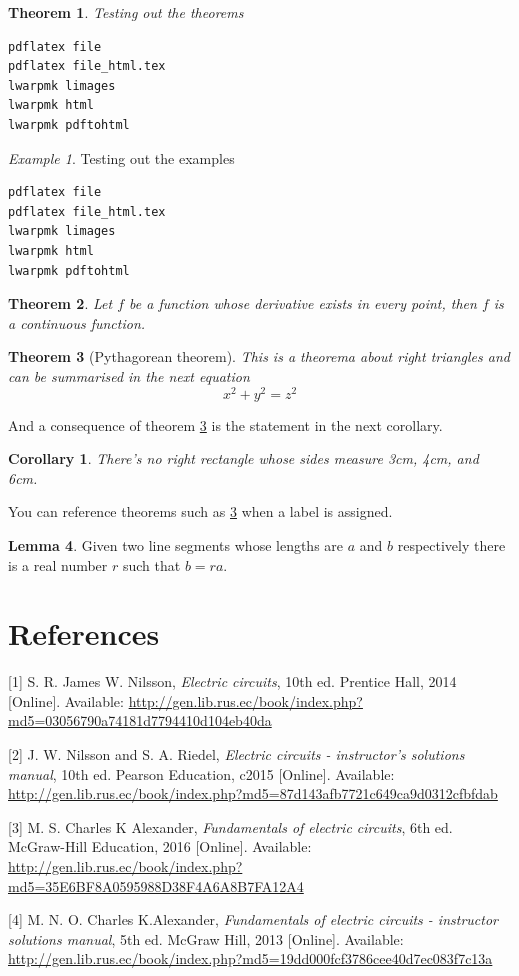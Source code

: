 \documentclass{report}
\theoremstyle{plain}
\newtheorem{theorem}{Theorem}[section]
\newtheorem{corollary}{Corollary}[theorem]
\theoremstyle{definition}
\newtheorem{lemma}[theorem]{Lemma}
\theoremstyle{remark}
\newtheorem{example}{Example}[section]
\begin{document}
\begin{theorem}
	Testing out the theorems
\end{theorem}
\begin{verbatim}
pdflatex file
pdflatex file_html.tex
lwarpmk limages
lwarpmk html
lwarpmk pdftohtml
\end{verbatim}

\begin{example}
Testing out the examples
\begin{verbatim}
pdflatex file
pdflatex file_html.tex
lwarpmk limages
lwarpmk html
lwarpmk pdftohtml
\end{verbatim}
\end{example}

\begin{theorem}
	Let $f$ be a function whose derivative exists in every point, then $f$ is 
	a continuous function.
\end{theorem}

\begin{theorem}[Pythagorean theorem]
	\label{pythagorean}
	This is a theorema about right triangles and can be summarised in the next 
	equation 
	\[ x^2 + y^2 = z^2 \]
\end{theorem}

And a consequence of theorem \ref{pythagorean} is the statement in the next 
corollary.

\begin{corollary}
	There's no right rectangle whose sides measure 3cm, 4cm, and 6cm.
\end{corollary}

You can reference theorems such as \ref{pythagorean} when a label is assigned.

\begin{lemma}
	Given two line segments whose lengths are $a$ and $b$ respectively there is a 
	real number $r$ such that $b=ra$.
\end{lemma}
\chapter{References}
\hypertarget{ref-book:nilEC}{}%
{[}1{]} S. R. James W. Nilsson, \emph{Electric circuits}, 10th ed.
Prentice Hall, 2014 {[}Online{]}. Available:
\url{http://gen.lib.rus.ec/book/index.php?md5=03056790a74181d7794410d104eb40da}

\hypertarget{ref-book:nilECSol}{}%
{[}2{]} J. W. Nilsson and S. A. Riedel, \emph{Electric circuits -
	instructor's solutions manual}, 10th ed. Pearson Education, c2015
{[}Online{]}. Available:
\url{http://gen.lib.rus.ec/book/index.php?md5=87d143afb7721c649ca9d0312cfbfdab}

\hypertarget{ref-book:alexEC}{}%
{[}3{]} M. S. Charles K Alexander, \emph{Fundamentals of electric
	circuits}, 6th ed. McGraw-Hill Education, 2016 {[}Online{]}. Available:
\url{http://gen.lib.rus.ec/book/index.php?md5=35E6BF8A0595988D38F4A6A8B7FA12A4}

\hypertarget{ref-book:alexECSol}{}%
{[}4{]} M. N. O. Charles K.Alexander, \emph{Fundamentals of electric
	circuits - instructor solutions manual}, 5th ed. McGraw Hill, 2013
{[}Online{]}. Available:
\url{http://gen.lib.rus.ec/book/index.php?md5=19dd000fcf3786cee40d7ec083f7c13a}
\end{document}
